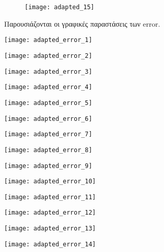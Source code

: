 \begin{figure}[bh]
	\centerfloat
	\texttt{[image: adapted\_15]}
	\label{fig:adapted-15}
\end{figure}

\newpage
Παρουσιάζονται οι γραφικές παραστάσεις των error.
\begin{multicols}{2}

\begin{Figure}
	\texttt{[image: adapted\_error\_1]}
	\label{fig:adapted-error-1}
\end{Figure}
\begin{Figure}
	\texttt{[image: adapted\_error\_2]}
	\label{fig:adapted-error-2}
\end{Figure}
\begin{Figure}
	\texttt{[image: adapted\_error\_3]}
	\label{fig:adapted-error-3}
\end{Figure}
\begin{Figure}
	\texttt{[image: adapted\_error\_4]}
	\label{fig:adapted-error-4}
\end{Figure}
\begin{Figure}
	\texttt{[image: adapted\_error\_5]}
	\label{fig:adapted-error-5}
\end{Figure}
\begin{Figure}
	\texttt{[image: adapted\_error\_6]}
	\label{fig:adapted-error-6}
\end{Figure}
\begin{Figure}
	\texttt{[image: adapted\_error\_7]}
	\label{fig:adapted-error-7}
\end{Figure}
\begin{Figure}
	\texttt{[image: adapted\_error\_8]}
	\label{fig:adapted-error-8}
\end{Figure}
\begin{Figure}
	\texttt{[image: adapted\_error\_9]}
	\label{fig:adapted-error-9}
\end{Figure}
\begin{Figure}
	\texttt{[image: adapted\_error\_10]}
	\label{fig:adapted-error-10}
\end{Figure}
\begin{Figure}
	\texttt{[image: adapted\_error\_11]}
	\label{fig:adapted-error-11}
\end{Figure}
\begin{Figure}
	\texttt{[image: adapted\_error\_12]}
	\label{fig:adapted-error-12}
\end{Figure}
\begin{Figure}
	\texttt{[image: adapted\_error\_13]}
	\label{fig:adapted-error-13}
\end{Figure}
\begin{Figure}
	\texttt{[image: adapted\_error\_14]}
	\label{fig:adapted-error-14}
\end{Figure}

\end{multicols}

